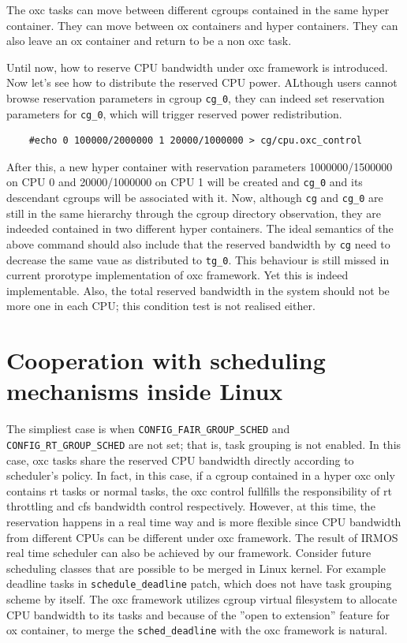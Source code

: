 The oxc tasks can move between different cgroups contained in the same 
hyper container. They can move between ox containers and hyper containers.
They can also leave an ox container and return to be a non oxc task.

Until now, how to reserve CPU bandwidth under oxc framework is introduced.
Now let's see how to distribute the reserved CPU power.
ALthough users cannot browse reservation parameters in cgroup
\texttt{cg\_0}, they can indeed set reservation parameters for 
\texttt{cg\_0}, which will trigger reserved power redistribution.
\begin{lstlisting}
	#echo 0 100000/2000000 1 20000/1000000 > cg/cpu.oxc_control
\end{lstlisting}
After this, a new hyper container with reservation parameters
1000000/1500000 on CPU 0 and 20000/1000000 on CPU 1 will be created
and \texttt{cg\_0} and its descendant cgroups will be associated with
it. Now, although \texttt{cg} and \texttt{cg\_0} are still in the same
hierarchy through the cgroup directory observation, they are indeeded 
contained in two different hyper containers.
The ideal semantics of the above command should also include that the 
reserved bandwidth by \texttt{cg} need to decrease the same vaue as 
distributed to \texttt{tg\_0}. This behaviour is still missed in current 
prorotype implementation of oxc framework. Yet this is indeed implementable.
Also, the total reserved bandwidth in the system should not be more one in
each CPU; this condition test is not realised either.

\section{Cooperation with scheduling mechanisms inside Linux}
The simpliest case is when \texttt{CONFIG\_FAIR\_GROUP\_SCHED} and 
\texttt{CONFIG\_RT\_GROUP\_SCHED} are not set; that is, task grouping is not 
enabled. In this case, oxc tasks share the reserved CPU bandwidth directly
according to scheduler's policy. In fact, in this case, if a cgroup contained
in a hyper oxc only contains rt tasks or normal tasks, the oxc control
fullfills the responsibility of rt throttling and cfs bandwidth control
respectively. However, at this time, the reservation happens in a real time
way and is more flexible since CPU bandwidth from different CPUs can be 
different under oxc framework. The result of IRMOS real time scheduler can 
also be achieved by our framework.
Consider future scheduling classes that are possible to be merged in Linux kernel.
For example deadline tasks in \texttt{schedule\_deadline} patch, which does not
have task grouping scheme by itself. The oxc framework utilizes cgroup virtual 
filesystem to allocate CPU bandwidth to its tasks and because of the 
''open to extension'' feature for ox container, to merge the \texttt{sched\_deadline}
with the oxc framework is natural.

